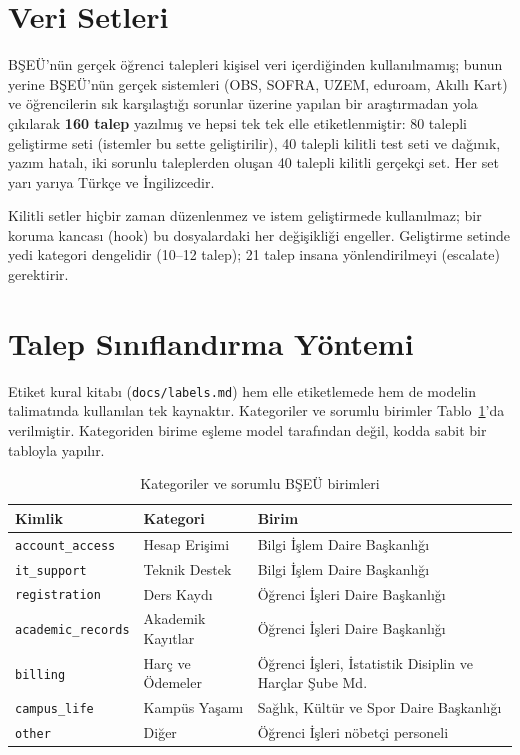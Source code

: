 \section{Veri Setleri}
\label{sec:veri}

BŞEÜ'nün gerçek öğrenci talepleri kişisel veri içerdiğinden kullanılmamış; bunun yerine BŞEÜ'nün gerçek
sistemleri (OBS, SOFRA, UZEM, eduroam, Akıllı Kart) ve öğrencilerin sık karşılaştığı sorunlar üzerine
yapılan bir araştırmadan yola çıkılarak \textbf{160 talep} yazılmış ve hepsi tek tek elle
etiketlenmiştir: 80 talepli geliştirme seti (istemler bu sette geliştirilir), 40 talepli kilitli
test seti ve dağınık, yazım hatalı, iki sorunlu taleplerden oluşan 40 talepli kilitli gerçekçi set.
Her set yarı yarıya Türkçe ve İngilizcedir.


Kilitli setler hiçbir zaman düzenlenmez ve istem geliştirmede kullanılmaz; bir koruma kancası (hook)
bu dosyalardaki her değişikliği engeller. Geliştirme setinde yedi kategori dengelidir (10--12 talep);
21 talep insana yönlendirilmeyi (escalate) gerektirir.

\section{Talep Sınıflandırma Yöntemi}

Etiket kural kitabı (\texttt{docs/labels.md}) hem elle etiketlemede hem de modelin talimatında
kullanılan tek kaynaktır. Kategoriler ve sorumlu birimler Tablo~\ref{tab:kategori}'da verilmiştir.
Kategoriden birime eşleme model tarafından değil, kodda sabit bir tabloyla yapılır.

\begin{table}[!ht]
\centering
\caption{Kategoriler ve sorumlu BŞEÜ birimleri}
\label{tab:kategori}
\small
\begin{tabularx}{\textwidth}{@{}l l X@{}}
\toprule
\textbf{Kimlik} & \textbf{Kategori} & \textbf{Birim} \\
\midrule
\texttt{account\_access} & Hesap Erişimi & Bilgi İşlem Daire Başkanlığı \\
\texttt{it\_support} & Teknik Destek & Bilgi İşlem Daire Başkanlığı \\
\texttt{registration} & Ders Kaydı & Öğrenci İşleri Daire Başkanlığı \\
\texttt{academic\_records} & Akademik Kayıtlar & Öğrenci İşleri Daire Başkanlığı \\
\texttt{billing} & Harç ve Ödemeler & Öğrenci İşleri, İstatistik Disiplin ve Harçlar Şube Md. \\
\texttt{campus\_life} & Kampüs Yaşamı & Sağlık, Kültür ve Spor Daire Başkanlığı \\
\texttt{other} & Diğer & Öğrenci İşleri nöbetçi personeli \\
\bottomrule
\end{tabularx}
\end{table}

